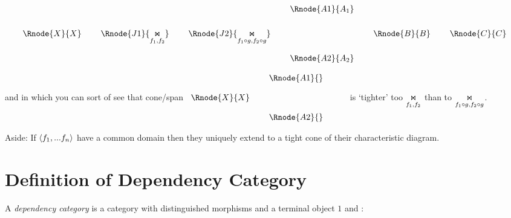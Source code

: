 \documentclass[10pt,a4paper]{scrartcl}
\begin{document}
\begin{center}
\begin{equation}
\begin{array}{cp{0.1cm}cp{0.1cm}cp{0.1cm}cp{0.1cm} cp{0.1cm} c}
 &&&&           & &\Rnode{A1}{A_1}                           \\ [0.6cm]
 \Rnode{X}{X}&&\Rnode{J1}{\fibrex{}{}{f_1,f_2}}&&\Rnode{J2}{\fibrex{}{}{f_1 \circ g, f_2\circ g}}& &   & & \Rnode{B}{B} & &\Rnode{C}{C}\\ [0.6cm]
  &&&&           & &\Rnode{A2}{A_2}
\end{array}
\end{equation}
\end{center}


\noindent and in which you can sort of see that cone/span
$
\begin{array}{cp{0.1cm}cp{0.1cm} c}
            & &\Rnode{A1}{}                           \\ [0.4cm]
\Rnode{X}{X}& &                & &  \\ [0.4cm]
            & &\Rnode{A2}{}
\end{array}
$
 is `tighter' too
$\underset{f_1,f_2}{\Join}$ than to 
$\underset{f_1 \circ g, f_2\circ g}{\Join}$.

\noindent Aside: If $\langle f_1,...f_n\rangle$ have a common domain then they uniquely extend to a tight cone of their characteristic diagram. 

\section{Definition of Dependency Category}
A \textit{dependency category} is a category  with distinguished morphisms and a terminal object $1$ and :
\end{document}
